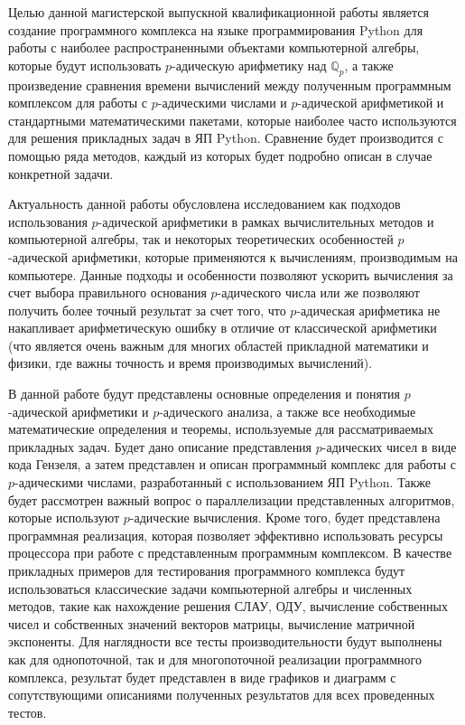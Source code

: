 \documentclass[master, och, diploma, times]{sty/SCWorks}
\theoremstyle{plain}
\theoremstyle{definition}
\numberwithin{equation}{section}
\begin{document}
Целью данной магистерской выпускной квалификационной работы является создание программного комплекса на языке программирования Python для работы с наиболее распространенными объектами компьютерной алгебры, которые будут использовать $p$-адическую арифметику над $\mathbb{Q}_p$, а также произведение сравнения времени вычислений между полученным программным комплексом для работы с $p$-адическими числами и $p$-адической арифметикой и стандартными математическими пакетами, которые наиболее часто используются для решения прикладных задач в ЯП Python. Сравнение будет производится с помощью ряда методов, каждый из которых будет подробно описан в случае конкретной задачи.
 
Актуальность данной работы обусловлена исследованием как подходов использования $p$-адической арифметики в рамках вычислительных методов и компьютерной алгебры, так и некоторых теоретических особенностей $p$-адической арифметики, которые применяются к вычислениям, производимым на компьютере. Данные подходы и особенности позволяют ускорить вычисления за счет выбора правильного основания $p$-адического числа или же  позволяют получить более точный результат за счет того, что $p$-адическая арифметика не накапливает арифметическую ошибку в отличие от классической арифметики (что является очень важным для многих областей прикладной математики и физики, где важны точность и время производимых вычислений).

В данной работе будут представлены основные определения и понятия $p$-адической арифметики и $p$-адического анализа, а также все необходимые математические определения и теоремы, используемые для рассматриваемых прикладных задач. Будет дано описание представления $p$-адических чисел в виде кода Гензеля, а затем представлен и описан программный комплекс для работы с $p$-адическими числами, разработанный с использованием  ЯП Python. Также будет рассмотрен важный вопрос о параллелизации представленных алгоритмов, которые используют $p$-адические вычисления. Кроме того, будет представлена программная реализация, которая позволяет эффективно использовать ресурсы процессора при работе с представленным программным комплексом. В качестве прикладных примеров для тестирования программного комплекса будут использоваться классические задачи компьютерной алгебры и численных методов, такие как нахождение решения СЛАУ, ОДУ, вычисление собственных чисел и собственных значений векторов матрицы, вычисление матричной экспоненты. Для наглядности все тесты производительности будут выполнены  как для однопоточной, так и для многопоточной реализации программного комплекса, результат будет представлен в виде графиков и диаграмм с сопутствующими описаниями полученных результатов для всех проведенных тестов.
\end{document}
